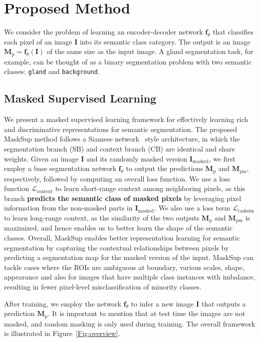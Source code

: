 \documentclass{bmvc2k}
\begin{document}
\section{Proposed Method}
We consider the problem of learning an encoder-decoder network $\bm{f}_{\theta}$ that classifies each pixel of an image $\bm{I}$ into its semantic class category. The output is an image $\bm{M}_\text{p} = \bm{f}_{\theta}(\bm{I})$ of the same size as the input image. A gland segmentation task, for example, can be thought of as a binary segmentation problem with two semantic classes: \texttt{gland} and \texttt{background}.

\subsection{Masked Supervised Learning}
We present a masked supervised learning framework for effectively learning rich and discriminative representations for semantic segmentation. The proposed MaskSup method follows a Siamese network~\cite{bromley1993signature} style architecture, in which the segmentation branch (SB) and context branch (CB) are identical and share weights. Given an image $\bm{I}$ and its randomly masked version $\bm{I}_\text{masked}$, we first employ a base segmentation network $\bm{f}_{\theta}$ to output the predictions $\bm{M}_\text{p}$ and $\bm{M}_\text{pm}$, respectively, followed by computing an overall loss function. We use a loss function $\mathcal{L}_\text{context}$ to learn short-range context among neighboring pixels, as this branch \textbf{predicts the semantic class of masked pixels} by leveraging pixel information from the non-masked parts in $\bm{I}_\text{masked}$. We also use a loss term $\mathcal{L}_\text{tasksim}$ to learn long-range context, as the similarity of the two outputs $\bm{M}_\text{p}$ and $\bm{M}_\text{pm}$ is maximized, and hence enables us to better learn the shape of the semantic classes. Overall, MaskSup enables better representation learning for semantic segmentation by capturing the contextual relationships between pixels by predicting a segmentation map for the masked version of the input. MaskSup can tackle cases where the ROIs are ambiguous at boundary, various scales, shape, appearance and also for images that have multiple class instances with imbalance, resulting in fewer pixel-level misclassification of minority classes.

After training, we employ the network $\bm{f}_{\theta}$ to infer a new image $\bm{I}$ that outputs a prediction $\bm{M}_\text{p}$. It is important to mention that at test time the images are not masked, and random masking is only used during training. The overall framework is illustrated in Figure~\ref{Fig:overview}.
\end{document}
